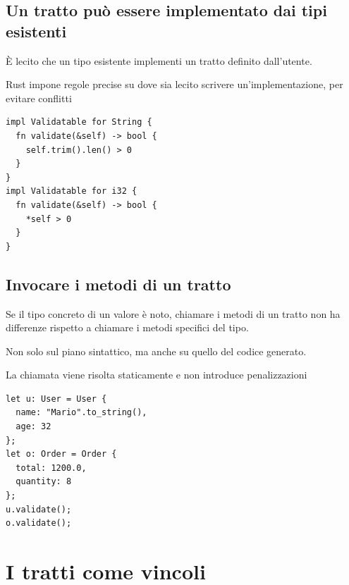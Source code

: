 \subsection{Un tratto può essere implementato dai tipi esistenti}

\begin{center}
  \begin{minipage}{0.45\linewidth}
    È lecito che un tipo esistente implementi un tratto definito dall'utente.


    Rust impone regole precise su dove sia lecito scrivere un'implementazione,
    per evitare conflitti
  \end{minipage}%
  \hfill
  \begin{minipage}{0.45\linewidth}
    \begin{verbatim}
impl Validatable for String {
  fn validate(&self) -> bool {
    self.trim().len() > 0
  }
}
impl Validatable for i32 {
  fn validate(&self) -> bool {
    *self > 0
  }
}
\end{verbatim}
  \end{minipage}
\end{center}


\subsection{Invocare i metodi di un tratto}


\begin{center}
  \begin{minipage}{0.45\linewidth}
    Se il tipo concreto di un valore è noto,
    chiamare i metodi di un tratto non ha
    differenze rispetto a chiamare i metodi
    specifici del tipo.

    Non solo sul piano sintattico, ma anche
    su quello del codice generato.

    La chiamata viene risolta staticamente
    e non introduce penalizzazioni
  \end{minipage}%
  \hfill
  \begin{minipage}{0.45\linewidth}
    \begin{verbatim}
let u: User = User {
  name: "Mario".to_string(),
  age: 32
};
let o: Order = Order {
  total: 1200.0,
  quantity: 8
};
u.validate();
o.validate();
\end{verbatim}
  \end{minipage}
\end{center}

\section{I tratti come vincoli}


